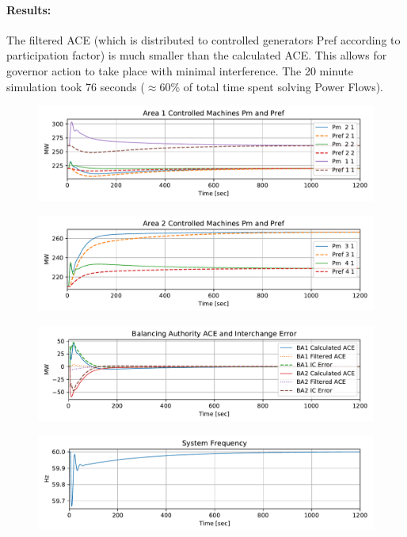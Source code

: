 \documentclass[12pt]{article}
\begin{document}
\paragraph{Results:} The filtered ACE (which is distributed to controlled generators Pref according to participation factor) is much smaller than the calculated ACE. This allows for governor action to take place with minimal interference. The 20 minute simulation took 76 seconds ($\approx$60\% of total time spent solving Power Flows).
\begin{figure}[h!]
		\centering
		\includegraphics[width=\linewidth]{area1}\vspace{-1em}
\end{figure}\vspace{-1.5em}
\begin{figure}[h!]
		\centering
		\includegraphics[width=\linewidth]{area2}\vspace{-1em}
\end{figure}\vspace{-1.5em}
\begin{figure}[h!]
		\centering
		\includegraphics[width=\linewidth]{ace}\vspace{-1em}
\end{figure}\vspace{-1.5em}
\begin{figure}[h!]
		\centering
		\includegraphics[width=\linewidth]{freq}\vspace{-1em}
\end{figure}\vspace{-1.5em}
\end{document}
